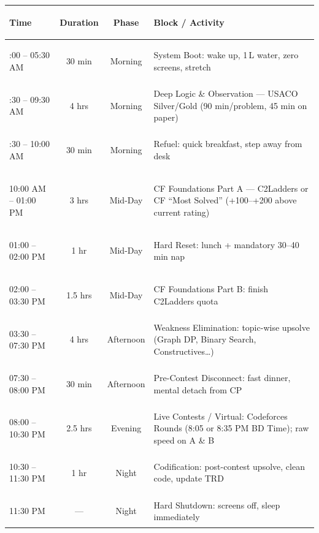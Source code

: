\documentclass[12pt, a4paper]{article}
\begin{document}
\vspace{0.8em}
{%
\renewcommand{\arraystretch}{1.5}
\begin{tabularx}{\textwidth}{|%
  >{\bfseries\raggedright\arraybackslash}p{3.4cm}|%
  c|%
  c|%
  >{\raggedright\arraybackslash}X|%
}
\hline
\rowcolor{primary!90!black}
{\color{white}\centering\textbf{Time}} &
{\color{white}\textbf{Duration}} &
{\color{white}\textbf{Phase}} &
{\color{white}\centering\arraybackslash\textbf{Block / Activity}} \\
\hline
05:00 -- 05:30 AM & 30 min & Morning &
  System Boot: wake up, 1\,L water, zero screens, stretch \\
\hline
05:30 -- 09:30 AM & 4 hrs & Morning &
  Deep Logic \& Observation --- USACO Silver/Gold (90 min/problem, 45 min on paper) \\
\hline
09:30 -- 10:00 AM & 30 min & Morning &
  Refuel: quick breakfast, step away from desk \\
\hline
\rowcolor{blue!6}
10:00 AM -- 01:00 PM & 3 hrs & Mid-Day &
  CF Foundations Part A --- C2Ladders or CF ``Most Solved'' (+100--+200 above current rating) \\
\hline
\rowcolor{blue!6}
01:00 -- 02:00 PM & 1 hr & Mid-Day &
  Hard Reset: lunch + mandatory 30--40 min nap \\
\hline
\rowcolor{blue!6}
02:00 -- 03:30 PM & 1.5 hrs & Mid-Day &
  CF Foundations Part B: finish C2Ladders quota \\
\hline
\rowcolor{orange!8}
03:30 -- 07:30 PM & 4 hrs & Afternoon &
  Weakness Elimination: topic-wise upsolve (Graph DP, Binary Search, Constructives\ldots) \\
\hline
\rowcolor{orange!8}
07:30 -- 08:00 PM & 30 min & Afternoon &
  Pre-Contest Disconnect: fast dinner, mental detach from CP \\
\hline
\rowcolor{green!6}
08:00 -- 10:30 PM & 2.5 hrs & Evening &
  Live Contests / Virtual: Codeforces Rounds (8:05 or 8:35 PM BD Time); raw speed on A \& B \\
\hline
\rowcolor{gray!10}
10:30 -- 11:30 PM & 1 hr & Night &
  Codification: post-contest upsolve, clean code, update TRD \\
\hline
\rowcolor{gray!10}
11:30 PM & --- & Night &
  Hard Shutdown: screens off, sleep immediately \\
\hline
\end{tabularx}
}
\vspace{0.8em}

\end{document}
